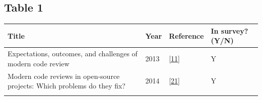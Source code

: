 \documentclass[]{book}
\begin{document}
\subsection{Table 1}\label{table-1}

\begin{longtable}[]{@{}llll@{}}
\toprule
\begin{minipage}[b]{0.63\columnwidth}\raggedright\strut
Title\strut
\end{minipage} & \begin{minipage}[b]{0.03\columnwidth}\raggedright\strut
Year\strut
\end{minipage} & \begin{minipage}[b]{0.14\columnwidth}\raggedright\strut
Reference\strut
\end{minipage} & \begin{minipage}[b]{0.09\columnwidth}\raggedright\strut
In survey? (Y/N)\strut
\end{minipage}\tabularnewline
\midrule
\endhead
\begin{minipage}[t]{0.63\columnwidth}\raggedright\strut
Expectations, outcomes, and challenges of modern code review\strut
\end{minipage} & \begin{minipage}[t]{0.03\columnwidth}\raggedright\strut
2013\strut
\end{minipage} & \begin{minipage}[t]{0.14\columnwidth}\raggedright\strut
{[}\protect\hyperlink{ref-bacchelli2013expectations}{11}{]}\strut
\end{minipage} & \begin{minipage}[t]{0.09\columnwidth}\raggedright\strut
Y\strut
\end{minipage}\tabularnewline
\begin{minipage}[t]{0.63\columnwidth}\raggedright\strut
Modern code reviews in open-source projects: Which problems do they
fix?\strut
\end{minipage} & \begin{minipage}[t]{0.03\columnwidth}\raggedright\strut
2014\strut
\end{minipage} & \begin{minipage}[t]{0.14\columnwidth}\raggedright\strut
{[}\protect\hyperlink{ref-beller2014modern}{21}{]}\strut
\end{minipage} & \begin{minipage}[t]{0.09\columnwidth}\raggedright\strut
Y\strut
\end{minipage}\tabularnewline
\begin{minipage}[t]{0.63\columnwidth}\raggedright\strut

\end{minipage}
\end{longtable}
\end{document}
